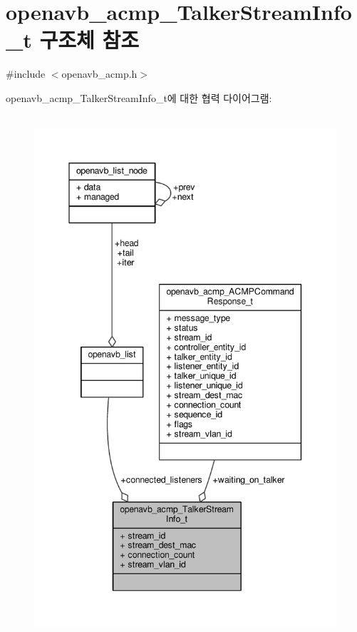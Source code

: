 \hypertarget{structopenavb__acmp___talker_stream_info__t}{}\section{openavb\+\_\+acmp\+\_\+\+Talker\+Stream\+Info\+\_\+t 구조체 참조}
\label{structopenavb__acmp___talker_stream_info__t}


{\ttfamily \#include $<$openavb\+\_\+acmp.\+h$>$}



openavb\+\_\+acmp\+\_\+\+Talker\+Stream\+Info\+\_\+t에 대한 협력 다이어그램\+:
\nopagebreak
\begin{figure}[H]
\begin{center}
\leavevmode
\includegraphics[height=550pt]{structopenavb__acmp___talker_stream_info__t__coll__graph}
\end{center}
\end{figure}
